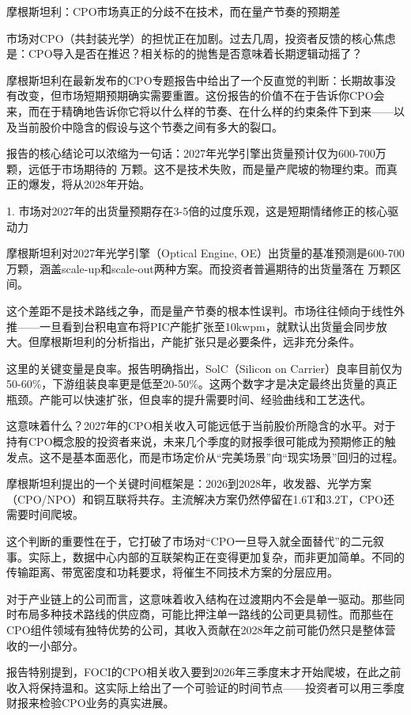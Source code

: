 \documentclass[11pt]{ctexart}
\begin{document}
摩根斯坦利：CPO市场真正的分歧不在技术，而在量产节奏的预期差

市场对CPO（共封装光学）的担忧正在加剧。过去几周，投资者反馈的核心焦虑是：CPO导入是否在推迟？相关标的的抛售是否意味着长期逻辑动摇了？

摩根斯坦利在最新发布的CPO专题报告中给出了一个反直觉的判断：长期故事没有改变，但市场短期预期确实需要重置。这份报告的价值不在于告诉你CPO会来，而在于精确地告诉你它将以什么样的节奏、在什么样的约束条件下到来——以及当前股价中隐含的假设与这个节奏之间有多大的裂口。

报告的核心结论可以浓缩为一句话：2027年光学引擎出货量预计仅为600-700万颗，远低于市场期待的 万颗。这不是技术失败，而是量产爬坡的物理约束。而真正的爆发，将从2028年开始。

1. 市场对2027年的出货量预期存在3-5倍的过度乐观，这是短期情绪修正的核心驱动力

摩根斯坦利对2027年光学引擎（Optical Engine, OE）出货量的基准预测是600-700万颗，涵盖scale-up和scale-out两种方案。而投资者普遍期待的出货量落在 万颗区间。

这个差距不是技术路线之争，而是量产节奏的根本性误判。市场往往倾向于线性外推——一旦看到台积电宣布将PIC产能扩张至10kwpm，就默认出货量会同步放大。但摩根斯坦利的分析指出，产能扩张只是必要条件，远非充分条件。

这里的关键变量是良率。报告明确指出，SolC（Silicon on Carrier）良率目前仅为50-60\%，下游组装良率更是低至20-50\%。这两个数字才是决定最终出货量的真正瓶颈。产能可以快速扩张，但良率的提升需要时间、经验曲线和工艺迭代。

这意味着什么？2027年的CPO相关收入可能远低于当前股价所隐含的水平。对于持有CPO概念股的投资者来说，未来几个季度的财报季很可能成为预期修正的触发点。这不是基本面恶化，而是市场定价从“完美场景”向“现实场景”回归的过程。

摩根斯坦利提出的一个关键时间框架是：2026到2028年，收发器、光学方案（CPO/NPO）和铜互联将共存。主流解决方案仍然停留在1.6T和3.2T，CPO还需要时间爬坡。

这个判断的重要性在于，它打破了市场对“CPO一旦导入就全面替代”的二元叙事。实际上，数据中心内部的互联架构正在变得更加复杂，而非更加简单。不同的传输距离、带宽密度和功耗要求，将催生不同技术方案的分层应用。

对于产业链上的公司而言，这意味着收入结构在过渡期内不会是单一驱动。那些同时布局多种技术路线的供应商，可能比押注单一路线的公司更具韧性。而那些在CPO组件领域有独特优势的公司，其收入贡献在2028年之前可能仍然只是整体营收的一小部分。

报告特别提到，FOCI的CPO相关收入要到2026年三季度末才开始爬坡，在此之前收入将保持温和。这实际上给出了一个可验证的时间节点——投资者可以用三季度财报来检验CPO业务的真实进展。
\end{document}
